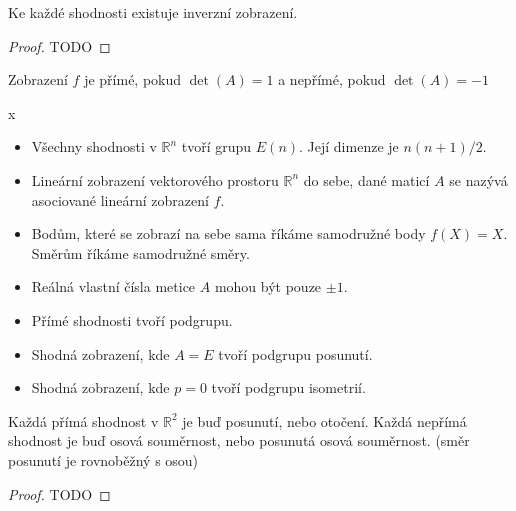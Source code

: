 \documentclass[../main.tex]{subfiles}
\begin{document}
    \begin{theorem}
        Ke každé shodnosti existuje inverzní zobrazení.
    \end{theorem}
    \begin{proof}
        TODO
    \end{proof}

    \begin{definition}
        Zobrazení $f$ je přímé, pokud $\det (A) = 1$ a nepřímé, pokud $\det (A) = -1$
    \end{definition}

    \begin{consequence} {\color{white} x}
        \begin{itemize}
            \item Všechny shodnosti v $\mathbb{R}^n$ tvoří grupu $E(n)$.
            Její dimenze je $n(n+1)/2$.
            \item Lineární zobrazení vektorového prostoru $\mathbb{R}^n$ do sebe, dané
            maticí $A$ se nazývá asociované lineární zobrazení $f$.
            \item Bodům, které se zobrazí na sebe sama říkáme samodružné body $f(X) = X$. 
            Směrům říkáme samodružné směry.
            \item Reálná vlastní čísla metice $A$ mohou být pouze $\pm 1$.
            \item Přímé shodnosti tvoří podgrupu.
            \item Shodná zobrazení, kde $A = E$ tvoří podgrupu posunutí.
            \item Shodná zobrazení, kde $p = 0$ tvoří podgrupu isometrií.
        \end{itemize}
    \end{consequence}

    \begin{theorem}
        Každá přímá shodnost v $\mathbb{R}^2$ je buď posunutí, nebo otočení. Každá nepřímá shodnost
        je buď osová souměrnost, nebo posunutá osová souměrnost. (směr posunutí je rovnoběžný s osou)
    \end{theorem}
    \begin{proof}
        TODO
    \end{proof}
\end{document}
